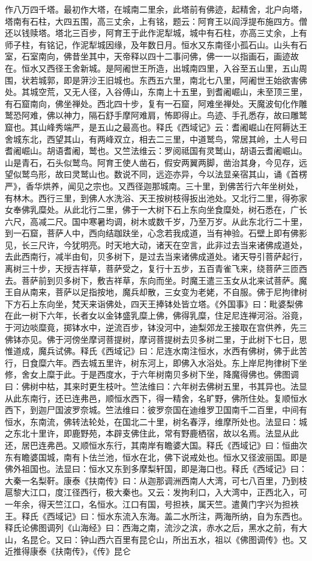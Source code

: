\documentclass[12pt,UTF8]{ctexbook}
\begin{document}
作八万四千塔。最初作大塔，在城南二里余，此塔前有佛迹，起精舍，北户向塔，塔南有石柱，大四五围，高三丈余，上有铭，题云：阿育王以阎浮提布施四方。僧还以钱赎塔。塔北三百步，阿育王于此作泥犁城，城中有石柱，亦高三丈余，上有师子柱，有铭记，作泥犁城因缘，及年数日月。恒水又东南径小孤石山。山头有石室，石室南向，佛昔坐其中，天帝释以四十二事问佛，佛一一以指画石，画迹故在。恒水又西径王舍新城。是阿阇世王所造，出城南四里，入谷至五山里，五山周围，状若城郭，即是蓱沙王旧城也。东西五六里，南北七八里，阿阇世王始欲害佛处。其城空荒，又无人径，入谷傅山，东南上十五里，到耆阇崛山，未至顶三里，有石窟南向，佛坐禅处。西北四十步，复有一石窟，阿难坐禅处。天魔波旬化作雕鹫恐阿难，佛以神力，隔石舒手摩阿难肩，怖即得止。鸟迹、手孔悉存，故曰雕鹫窟也。其山峰秀端严，是五山之最高也。释氏《西域记》云：耆阇崛山在阿耨达王舍城东北，西望其山，有两峰双立，相去二三里，中道鹫鸟，常居其岭，土人号曰耆阇崛山。胡语耆阇，鹫也。又竺法维云：罗阅祗国有灵鹫山，胡语云耆阇崛山。山是青石，石头似鹫鸟。阿育王使人凿石，假安两翼两脚，凿治其身，今见存，远望似鹫鸟形，故曰灵鹫山也。数说不同，远迩亦异，今以法显亲宿其山，诵《首楞严》，香华烘养，闻见之宗也。又西径迦那城南。三十里，到佛苦行六年坐树处，有林木。西行三里，到佛人水洗浴、天王按树枝得扳出池处。又北行二里，得弥家女奉佛乳糜处。从此北行二里，佛于一大树下石上东向坐食糜处，树石悉在，广长六尺，高减二尺。国中寒暑均调，树木或数千岁，乃至万岁。从此东北行二十里，到一石窟，菩萨人中，西向结跏趺坐，心念若我成道，当有神验。石壁上即有佛影见，长三尺许，今犹明亮。时天地大动，诸天在空言，此非过去当来诸佛成道处，去此西南行，减半由旬，贝多树下，是过去当来诸佛成道处。诸天导引菩萨起行，离树三十步，天授吉祥草，菩萨受之，复行十五步，五百青雀飞来，绕菩萨三匝西去。菩萨前到贝多树下，敷吉祥草，东向而坐。时魔王遣三玉女从北来试菩萨。魔王自从南来，菩萨以足指按地，魔兵却散，三女变为老姥，不自服。佛于尼拘律树下方石上东向坐，梵天来诣佛处，四天王捧钵处皆立塔。《外国事》曰：毗婆梨佛在此一树下六年，长者女以金钵盛乳糜上佛，佛得乳糜，住足尼连禅河浴。浴竟，于河边啖糜竟，掷钵水中，逆流百步，钵没河中，迪梨郊龙王接取在宫供养，先三佛钵亦见。佛于河傍坐摩诃菩提树，摩诃菩提树去贝多树二里，于此树下七日，思惟道成，魔兵试佛。释氏《西域记》曰：尼连水南注恒水，水西有佛树，佛于此苦行，日食糜六年。西去城五里许，树东河上，即佛入水浴处。东上岸尼拘律树下坐修，舍女上糜于此。于是西度水，于六年树南贝多树下坐，降魔得佛也。佛图调曰：佛树中枯，其来时更生枝叶。竺法维曰：六年树去佛树五里，书其异也。法显从此东南行，还已连弗邑，顺恒水西下，得一精舍，名旷野，佛所住处。复顺恒水西下，到迦尸国波罗奈城。竺法维曰：彼罗奈国在迪维罗卫国南千二百里，中间有恒水，东南流，佛转法轮处，在国北二十里，树名春浮，维摩所处也。法显曰：城之东北十里许，即鹿野苑，本辟支佛住此，常有野鹿栖宿，故以名焉。法显从此还，居巴连弗邑。又顺恒水东行，其南岸有瞻婆大国。释氏《西域记》曰：恒曲次东有瞻婆国城，南有卜佉兰池，恒水在北，佛下说戒处也。恒水又径波丽国。即是佛外祖国也。法显曰：恒水又东到多摩梨轩国，即是海口也。释氏《西域记》曰：大秦一名梨靬。康泰《扶南传》曰：从迦那调洲西南人大湾，可七八百里，乃到枝扈黎大江口，度江径西行，极大秦也。又云：发拘利口，入大湾中，正西北入，可一年余，得天竺江口，名恒水。江口有国，号担袟，属天竺。遣黄门字兴为担袟王。释氏《西域记》曰：恒水东流入东海。盖二水所注，两海所纳，自为东西也。释氏论佛图调列《山海经》曰：西海之南，流沙之滨，赤水之后，黑水之前，有大山，名昆仑。又曰：钟山西六百里有昆仑山，所出五水，祖以《佛图调传》也。又近推得康泰《扶南传》，《传》昆仑
\end{document}
